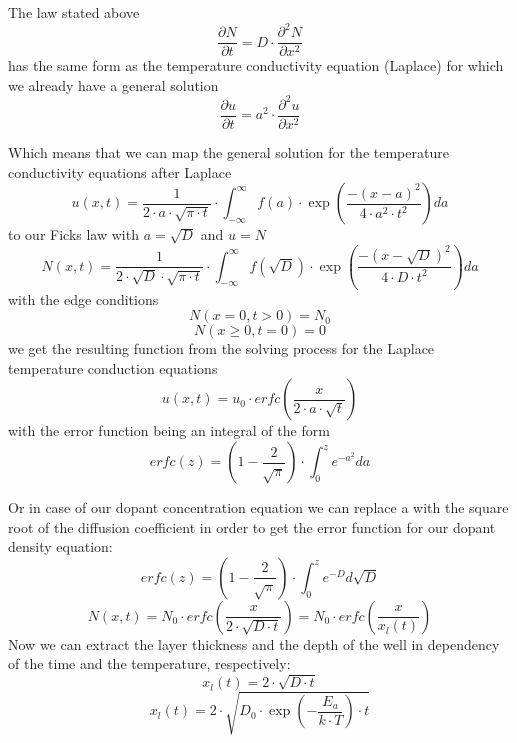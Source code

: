 The law stated above
\begin{equation}
\frac{\partial N}{\partial t} = D \cdot \frac{\partial^2 N}{\partial x^2} 
\end{equation}
has the same form as the temperature conductivity equation (Laplace) for which we already have a general solution
\begin{equation}
\frac{\partial u}{\partial t} = a^2 \cdot \frac{\partial^2 u}{\partial x^2} 
\end{equation}

Which means that we can map the general solution for the temperature conductivity equations after Laplace
\begin{equation}
u(x,t) = \frac{1}{2 \cdot a \cdot \sqrt{\pi \cdot t}} \cdot \int_{-\infty}^{\infty}{f(a)\cdot\exp\left(\frac{-(x-a)^2}{4 \cdot a^2 \cdot t^2}\right)}da
\end{equation}
to our Ficks law with $a=\sqrt{D}$ and $u=N$
\begin{equation}
N(x,t) = \frac{1}{2 \cdot \sqrt{D} \cdot \sqrt{\pi \cdot t}} \cdot \int_{-\infty}^{\infty}{f(\sqrt{D})\cdot\exp\left(\frac{-(x-\sqrt{D})^2}{4 \cdot D \cdot t^2}\right)}da
\label{eq:ficks_law_expanded}
\end{equation}
with the edge conditions
\begin{equation}
N( x=0 , t > 0 ) = N_0
\end{equation}
\begin{equation}
N( x \geq 0 ,  t = 0 ) = 0
\end{equation}
we get the resulting function from the solving process for the Laplace temperature conduction equations
\begin{equation}
u(x,t)=u_0 \cdot erfc\left(\frac{x}{2 \cdot a \cdot \sqrt{t}}\right)
\end{equation}
with the error function being an integral of the form
\begin{equation}
erfc(z)
=
\left(1-\frac{2}{\sqrt{\pi}}\right)\cdot\int_0^z{e^{-a^2}}da
\end{equation}

Or in case of our dopant concentration equation we can replace a with the square root of the diffusion coefficient in order to get the error function for our dopant density equation:
\begin{equation}
erfc(z)
=
\left(1-\frac{2}{\sqrt{\pi}}\right)\cdot\int_0^z{e^{-D}}d\sqrt{D}
\end{equation}
\begin{equation}
N(x,t)
=
N_0 \cdot erfc\left(\frac{x}{2 \cdot \sqrt{D \cdot t}}\right)
=
N_0 \cdot erfc\left(\frac{x}{x_l(t)}\right)
\end{equation}
Now we can extract the layer thickness and the depth of the well in dependency of the time and the temperature, respectively:
\begin{equation}
x_l(t) = 2 \cdot \sqrt{D \cdot t}
\end{equation}
\begin{equation}
x_l(t) = 2 \cdot \sqrt{D_0 \cdot \exp\left(-\frac{E_a}{k \cdot T}\right) \cdot t}
\end{equation}

